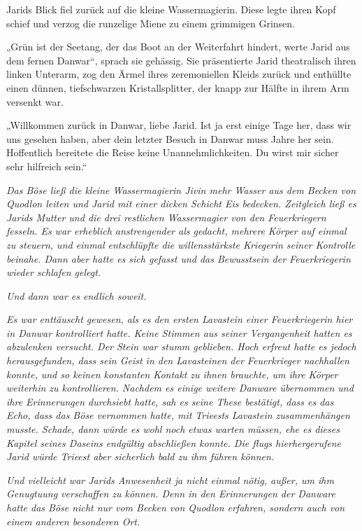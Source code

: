 Jarids Blick fiel zurück auf die kleine Wassermagierin. Diese legte ihren Kopf schief und verzog die runzelige Miene zu einem grimmigen Grinsen.

„Grün ist der Seetang, der das Boot an der Weiterfahrt hindert, werte Jarid aus dem fernen Danwar“, sprach sie gehässig. Sie präsentierte Jarid theatralisch ihren linken Unterarm, zog den Ärmel ihres zeremoniellen Kleids zurück und enthüllte einen dünnen, tiefschwarzen Kristallsplitter, der knapp zur Hälfte in ihrem Arm versenkt war.

„Willkommen zurück in Danwar, liebe Jarid. Ist ja erst einige Tage her, dass wir uns gesehen haben, aber dein letzter Besuch in Danwar muss Jahre her sein. Hoffentlich bereitete die Reise keine Unannehmlichkeiten. Du wirst mir sicher sehr hilfreich sein.“\bigskip







\textit{Das Böse ließ die kleine Wassermagierin Jivin mehr Wasser aus dem Becken von Quodlon leiten und Jarid mit einer dicken Schicht Eis bedecken. Zeitgleich ließ es Jarids Mutter und die drei restlichen Wassermagier von den Feuerkriegern fesseln. Es war erheblich anstrengender als gedacht, mehrere Körper auf einmal zu steuern, und einmal entschlüpfte die willensstärkste Kriegerin seiner Kontrolle beinahe. Dann aber hatte es sich gefasst und das Bewusstsein der Feuerkriegerin wieder schlafen gelegt.}

\textit{Und dann war es endlich soweit.}

\textit{Es war enttäuscht gewesen, als es den ersten Lavastein einer Feuerkriegerin hier in Danwar kontrolliert hatte. Keine Stimmen aus seiner Vergangenheit hatten es abzulenken versucht. Der Stein war stumm geblieben. Hoch erfreut hatte es jedoch herausgefunden, dass sein Geist in den Lavasteinen der Feuerkrieger nachhallen konnte, und so keinen konstanten Kontakt zu ihnen brauchte, um ihre Körper weiterhin zu kontrollieren. Nachdem es einige weitere Danware übernommen und ihre Erinnerungen durchsiebt hatte, sah es seine These bestätigt, dass es das Echo, dass das Böse vernommen hatte, mit Trieests Lavastein zusammenhängen musste. Schade, dann würde es wohl noch etwas warten müssen, ehe es dieses Kapitel seines Daseins endgültig abschließen konnte. Die flugs hierhergerufene Jarid würde Trieest aber sicherlich bald zu ihm führen können.}

\textit{Und vielleicht war Jarids Anwesenheit ja nicht einmal nötig, außer, um ihm Genugtuung verschaffen zu können. Denn in den Erinnerungen der Danware hatte das Böse nicht nur vom Becken von Quodlon erfahren, sondern auch von einem anderen besonderen Ort.}

